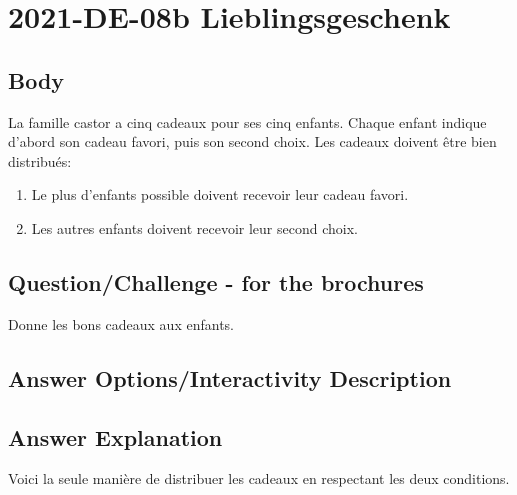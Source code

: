 \documentclass[a4paper,11pt]{report}
\newcommand{\taskGraphicsFolder}{..}
\begin{document}
\section*{\centering{} 2021-DE-08b Lieblingsgeschenk}


\subsection*{Body}

La famille castor a cinq cadeaux pour ses cinq enfants. Chaque enfant indique d’abord son cadeau favori, puis son second choix. Les cadeaux doivent être bien distribués:

\begin{enumerate}
  \item Le plus d’enfants possible doivent recevoir leur cadeau favori.
  \item Les autres enfants doivent recevoir leur second choix.
\end{enumerate}

{\em


\subsection*{Question/Challenge - for the brochures}

Donne les bons cadeaux aux enfants.

{\centering%
\par}

}

\begingroup
\renewcommand{\arraystretch}{1.5}
\subsection*{Answer Options/Interactivity Description}



\endgroup

\subsection*{Answer Explanation}

Voici la seule manière de distribuer les cadeaux en respectant les deux conditions.

{\centering%
\par}
\end{document}
